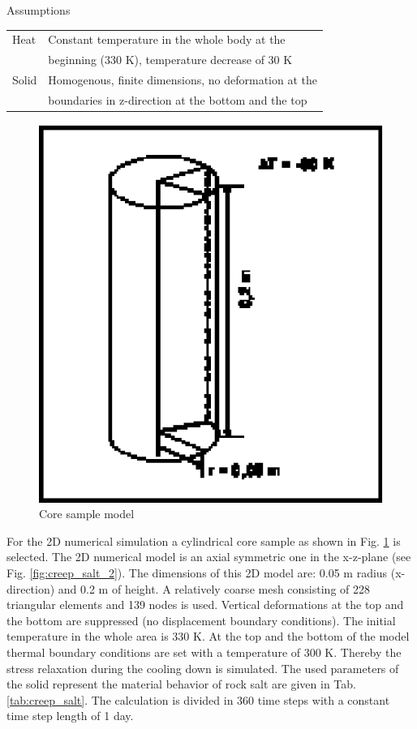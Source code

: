 Assumptions
\begin{tabular}{|ll|}
\hline\noalign{\smallskip}
Heat  & Constant temperature in the whole body at the \\
      & beginning (330 K), temperature decrease of 30 K \\
Solid & Homogenous, finite dimensions, no deformation at the \\
      & boundaries in z-direction at the bottom and the top \\
\hline
\end{tabular}

\begin{figure}[H]
\centering
\includegraphics[scale=0.5]{M/creep_salt_1}
\caption{Core sample model}
\label{fig:creep_salt_1}
\end{figure}

For the 2D numerical simulation a cylindrical core sample as shown
in Fig. \ref{fig:creep_salt_1} is selected. The 2D numerical model
is an axial symmetric one in the x-z-plane (see Fig.
\ref{fig:creep_salt_2}). The dimensions of this 2D model are: 0.05 m
radius (x-direction) and 0.2 m of height. A relatively coarse mesh
consisting of 228 triangular elements and 139 nodes is used.
Vertical deformations at the top and the bottom are suppressed (no
displacement boundary conditions). The initial temperature in the
whole area is 330 K. At the top and the bottom of the model thermal
boundary conditions are set with a temperature of 300 K. Thereby the
stress relaxation during the cooling down is simulated. The used
parameters of the solid represent the material behavior of rock salt
are given in Tab. \ref{tab:creep_salt}. The calculation is divided
in 360 time steps with a constant time step length of 1 day.

